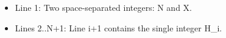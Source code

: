 \begin{itemize}
	\item      Line 1: Two space-separated integers: N and X.    
	\item      Lines 2..N+1: Line i+1 contains the single integer H\_i.    
\end{itemize}